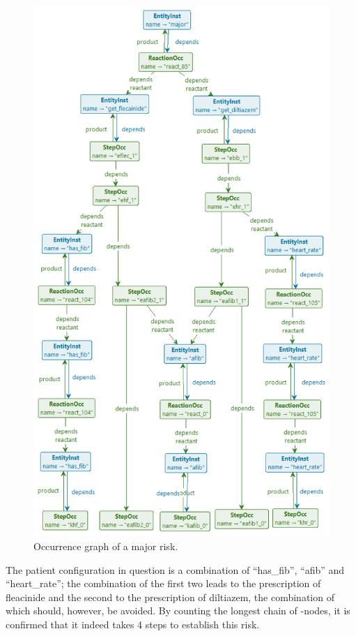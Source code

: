\begin{figure}
\centering
\includegraphics[scale=.3]{./figs/cmsb-pruned}
\caption{Occurrence graph of a major risk.}
\label{fig:cmsb-pruned}
\end{figure}

The patient configuration in question is a combination of ``has\_fib'', ``afib'' and ``heart\_rate''; the combination of the first two leads to the prescription of fleacinide and the second to the prescription of diltiazem, the combination of which should, however, be avoided. By counting the longest chain of \StepOcc-nodes, it is confirmed that it indeed takes 4 steps to establish this risk.

